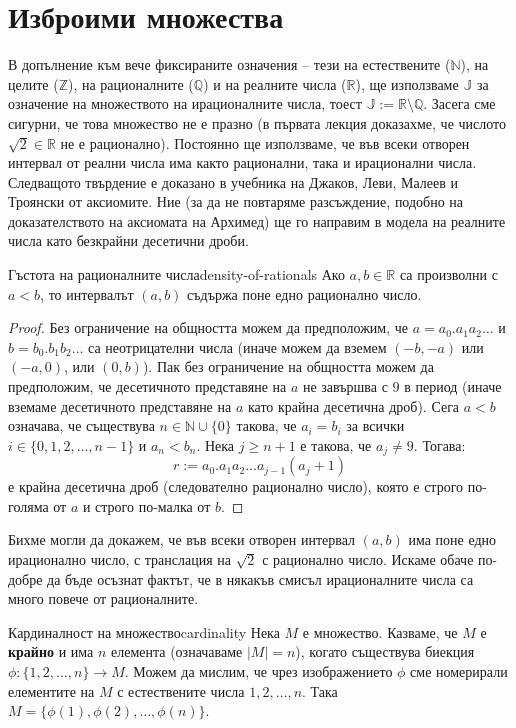 \section{Изброими множества}

В допълнение към вече фиксираните означения -- тези на естествените ($\mathbb{N}$), на целите ($\mathbb{Z}$), на рационалните ($\mathbb{Q}$) и на реалните числа ($\mathbb{R}$), ще използваме $\mathbb{J}$ за означение на множеството на ирационалните числа, тоест $\mathbb{J} := \mathbb{R} \setminus \mathbb{Q}$. Засега сме сигурни, че това множество не е празно (в първата лекция доказахме, че числото $\sqrt{2} \in \mathbb{R}$ не е рационално). Постоянно ще използваме, че във всеки отворен интервал от реални числа има както рационални, така и ирационални числа. Следващото твърдение е доказано в учебника на Джаков, Леви, Малеев и Троянски от аксиомите. Ние (за да не повтаряме разсъждение, подобно на доказателството на аксиомата на Архимед) ще го направим в модела на реалните числа като безкрайни десетични дроби.

\begin{lemma}{Гъстота на рационалните числа}{density-of-rationals}
Ако $a, b \in \mathbb{R}$ са произволни с $a < b$, то интервалът $(a, b)$ съдържа поне едно рационално число.
\end{lemma}

\begin{proof}
Без ограничение на общността можем да предположим, че $a = a_0.a_1a_2\dots$ и $b = b_0.b_1b_2\dots$ са неотрицателни числа (иначе можем да вземем $(-b, -a)$ или $(-a, 0)$, или $(0, b)$). Пак без ограничение на общността можем да предположим, че десетичното представяне на $a$ не завършва с $9$ в период (иначе вземаме десетичното представяне на $a$ като крайна десетична дроб). Сега $a < b$ означава, че съществува $n \in \mathbb{N} \cup \{0\}$ такова, че $a_i = b_i$ за всички $i \in \{0, 1, 2, \dots, n - 1\}$ и $a_n < b_n$. Нека $j \ge n + 1$ е такова, че $a_j \neq 9$. Тогава:
\[
r := a_0.a_1a_2\dots a_{j-1}(a_j + 1)
\]
е крайна десетична дроб (следователно рационално число), която е строго по-голяма от $a$ и строго по-малка от $b$.
\end{proof}

Бихме могли да докажем, че във всеки отворен интервал $(a, b)$ има поне едно ирационално число, с транслация на $\sqrt{2}$ с рационално число. Искаме обаче по-добре да бъде осъзнат фактът, че в някакъв смисъл ирационалните числа са много повече от рационалните.

\begin{definition}{Кардиналност на множество}{cardinality}
Нека $M$ е множество. Казваме, че $M$ е \textbf{крайно} и има $n$ елемента (означаваме $|M| = n$), когато съществува биекция $\phi : \{1, 2, \dots, n\} \to M$. Можем да мислим, че чрез изображението $\phi$ сме номерирали елементите на $M$ с естествените числа $1, 2, \dots, n$. Така $M = \{\phi(1), \phi(2), \dots, \phi(n)\}$.
\end{definition}

